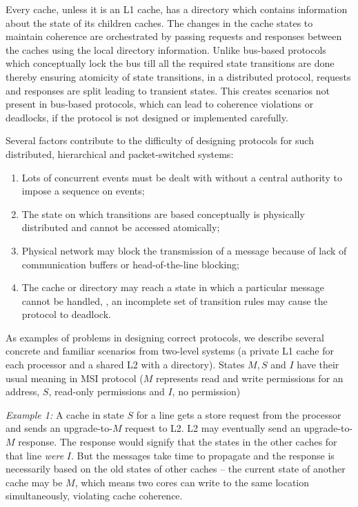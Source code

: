 Every cache, unless it is an L1 cache, has a directory which contains
information about the state of its children caches. The changes in the cache states to
maintain coherence are orchestrated by passing requests and responses between
the caches using the local directory information.  Unlike bus-based protocols
which conceptually lock the bus till all the required state transitions are done thereby
ensuring atomicity of state transitions, in a distributed protocol,
requests and responses are split leading to transient states. This creates
scenarios not present in bus-based protocols, which can lead to coherence
violations or deadlocks, if the protocol is not designed or implemented
carefully.

Several factors contribute to the difficulty of designing protocols for such
distributed, hierarchical and packet-switched systems:

\begin{enumerate}
\item Lots of concurrent events must be dealt with without a central authority
to impose a sequence on events;
\item The state on which transitions are based conceptually is physically
distributed and cannot be accessed atomically;
\item Physical network may block the transmission of a message because of lack
of communication buffers or head-of-the-line blocking;
\item The cache or directory may reach a state in which a particular message
cannot be handled, \ie, an incomplete set of transition rules may cause the protocol
to deadlock.
\end{enumerate}

As examples of problems in designing correct protocols, we describe several
concrete and familiar scenarios from two-level systems (a private L1 cache for
each processor and a shared L2 with a directory). States $M, S$ and $I$ have their
usual meaning in MSI protocol ($M$ represents read and write permissions for an
address, $S$, read-only permissions and $I$, no permission)

\noindent \emph{Example 1:} A cache in state $S$ for a line gets a store
request from the processor and sends an upgrade-to-$M$ request to L2.  L2 may
eventually send an upgrade-to-$M$ response. The response would signify that the
states in the other caches for that line \emph{were} $I$. But the messages take
time to propagate and the response is necessarily based on the old states of
other caches -- the current state of another cache may be $M$, which means two
cores can write to the same location simultaneously, violating cache coherence.

